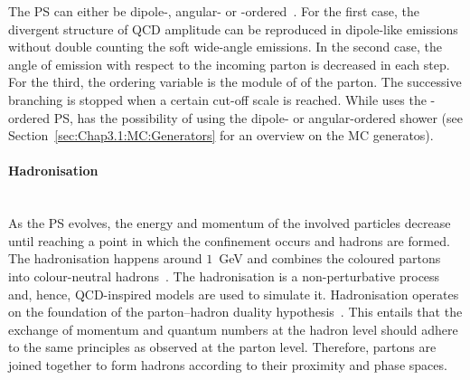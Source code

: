 The PS can either be dipole-, angular- or 
\pT-ordered~\cite{Platzer:2011bc, Gieseke:2003rz}. 
For the first case, the divergent structure of QCD amplitude can be reproduced in 
dipole-like emissions without double counting the soft wide-angle emissions.
In the second case, the angle of emission with respect to the incoming parton is decreased in each step. 
For the third, the ordering variable is the module of \pT of the parton. 
The successive branching is stopped when a certain cut-off scale is reached.
While \Pythia uses the \pT-ordered PS, \Herwig has the possibility of using
the dipole- or angular-ordered shower (see Section~\ref{sec:Chap3.1:MC:Generators} for 
an overview on the MC generatos).





\paragraph{Hadronisation}\mbox{}\\
As the PS evolves, the energy and momentum of the involved
particles decrease until reaching a point in which the confinement
occurs and hadrons are formed. The hadronisation happens
around $1$~GeV and combines the coloured partons into colour-neutral
hadrons~\cite{Hoche:2014rga}. The hadronisation is a non-perturbative process and, hence, 
QCD-inspired models are used to simulate it.
Hadronisation operates on the foundation of the parton--hadron duality
hypothesis~\cite{Azimov:1984np}. This entails that the exchange of momentum 
and quantum numbers at the hadron level should adhere to the same principles 
as observed at the parton level. Therefore, partons are joined together to form
hadrons according to their proximity and phase spaces. 

